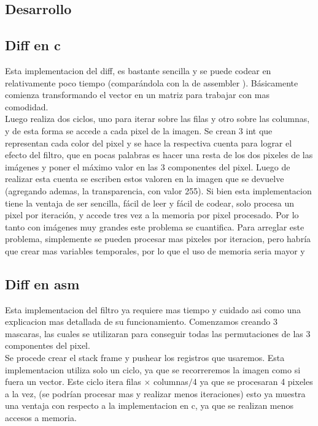 \subsection{Desarrollo}

\subsection{Diff en c}

Esta implementacion del diff, es bastante sencilla y se puede codear en relativamente poco tiempo (comparándola con la de assembler ). Básicamente comienza transformando el vector en un matriz para trabajar con mas comodidad. \\
Luego realiza dos ciclos, uno para iterar sobre las filas y otro sobre las columnas, y de esta forma se accede a cada pixel de la imagen. Se crean 3 int que representan cada color del pixel y se hace la respectiva cuenta para lograr el efecto del filtro, que en pocas palabras es hacer una resta de los dos pixeles de las imágenes y poner el máximo valor en las 3 componentes del pixel. Luego de realizar esta cuenta se escriben estos valoren en la imagen que se devuelve (agregando ademas, la transparencia, con valor 255). Si bien esta implementacion tiene la ventaja de ser sencilla, fácil de leer y fácil de codear, solo procesa un pixel por iteración, y accede tres vez a la memoria por pixel procesado. Por lo tanto con imágenes muy grandes este problema se cuantifica. Para arreglar este problema, simplemente se pueden procesar mas pixeles por iteracion, pero habría que crear mas variables temporales, por lo que el uso de memoria seria mayor y 
 
\subsection{Diff en asm}

Esta implementacion del filtro ya requiere mas tiempo y cuidado asi como una explicacion mas detallada de su funcionamiento. Comenzamos creando 3 mascaras, las cuales se utilizaran para conseguir todas las permutaciones de las 3 componentes del pixel. \\
Se procede crear el stack frame y pushear los registros que usaremos. Esta implementacion utiliza solo un ciclo, ya que se recorreremos la imagen como si fuera un vector. Este ciclo itera filas $\times$ columnas$/$4  ya que se procesaran 4 pixeles a la vez, (se podrían procesar mas y realizar menos iteraciones) esto ya muestra una ventaja con respecto a la implementacion en c, ya que se realizan menos accesos a memoria. \\

